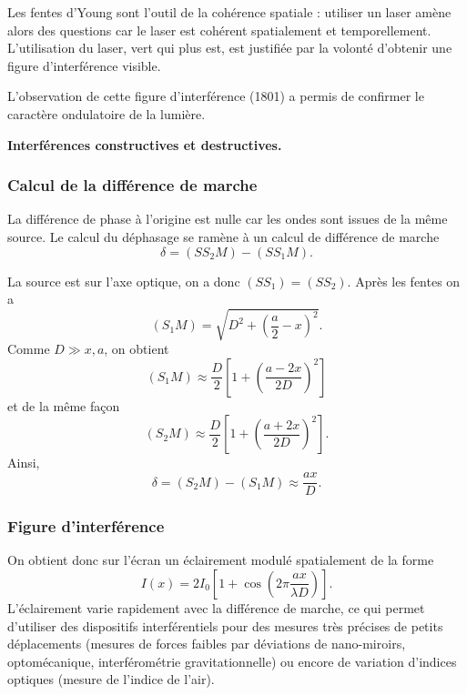\begin{remarque}
Les fentes d'Young sont l'outil de la cohérence spatiale : utiliser un laser amène alors des questions car le laser est cohérent spatialement et temporellement.
L'utilisation du laser, vert qui plus est, est justifiée par la volonté d'obtenir une figure d'interférence visible.
\end{remarque}

L'observation de cette figure d'interférence (1801) a permis de confirmer le caractère ondulatoire de la lumière.

\begin{slide}
\textbf{Interférences constructives et destructives.}
\end{slide}

\subsubsection{Calcul de la différence de marche}

La différence de phase à l'origine est nulle car les ondes sont issues de la même source.
Le calcul du déphasage se ramène à un calcul de différence de marche
\begin{equation}
\delta = (SS_2M)-(SS_1M).
\end{equation}

La source est sur l'axe optique, on a donc $(SS_1) = (SS_2)$.
Après les fentes on a 
\begin{equation}
(S_1M) = \sqrt{D^2 + \left(\frac{a}{2} - x\right)^2}.
\end{equation}
Comme $D \gg x, a$, on obtient
\begin{equation}
(S_1M)\approx\frac{D}{2}\left[1+\left(\frac{a-2x}{2D}\right)^2\right]
\end{equation}
et de la même façon
\begin{equation}
(S_2M) \approx \frac{D}{2}\left[1+\left(\frac{a+2x}{2D}\right)^2\right].
\end{equation}
Ainsi,
\begin{equation}
\delta = (S_2M) - (S_1M) \approx \frac{ax}{D}.
\end{equation}

\subsubsection{Figure d'interférence}

On obtient donc sur l'écran un éclairement modulé spatialement de la forme
\begin{equation}
I(x) = 2I_0 \left[1+\cos\left(2\pi\frac{ax}{\lambda D}\right) \right].
\end{equation}
L'éclairement varie rapidement avec la différence de marche, ce qui permet d'utiliser des dispositifs interférentiels pour des mesures très précises de petits déplacements (mesures de forces faibles par déviations de nano-miroirs, optomécanique, interférométrie gravitationnelle) ou encore de variation d'indices optiques (mesure de l'indice de l'air).

